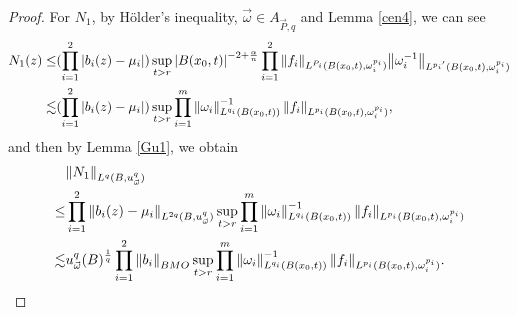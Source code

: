 \documentclass[11pt, twoside, leqno]{article}
\begin{document}
\begin{proof}[Proof]
	For ${N_1}$, by H\"older's inequality, $\vec{\omega} \in {A_{\vec P,q}}$ and Lemma \ref{cen4}, we can see 
	\begin{align}
	{N_1}(z)\notag
	\le& (\prod\limits_{i = 1}^2 {\left| {{b_i}(z) - {\mu _i}} \right|} )\mathop {\sup }\limits_{t > r} {\left| {B({x_0},t)} \right|^{ - 2 + \frac{\alpha }{n}}}\prod\limits_{i = 1}^2 {{{\left\| {{f_i}} \right\|}_{{L^{{P_i}}}(B({x_0},t),\omega _i^{{p_i}})}}{{\left\| {\omega _i^{ - 1}} \right\|}_{{L^{{p_i}^\prime }}(B({x_0},t),\omega _i^{{p_i}})}}}\notag\\
	\lesssim&(\prod\limits_{i = 1}^2 {\left| {{b_i}(z) - {\mu _i}} \right|} )\mathop {\sup }\limits_{t > r} \prod\limits_{i = 1}^m {\left\| {{\omega _i}} \right\|_{{L^{{q_i}}}(B({x_0},t))}^{ - 1}{{\left\| {{f_i}} \right\|}_{{L^{{p_i}}}(B({x_0},t),\omega _i^{{p_i}})}}},\notag
	\end{align}
	and then by Lemma \ref{Gu1}, we obtain
	\begin{align}
	&{\left\| {{N_1}} \right\|_{{L^q}(B,u_{\vec \omega }^q)}}\notag\\
	\le&\prod\limits_{i = 1}^2 {{{\left\| {{b_i}(z) - {\mu _i}} \right\|}_{{L^{2q}}(B,u_{\vec \omega }^q)}}} \mathop {\sup }\limits_{t > r} \prod\limits_{i = 1}^m {\left\| {{\omega _i}} \right\|_{{L^{{q_i}}}(B({x_0},t))}^{ - 1}{{\left\| {{f_i}} \right\|}_{{L^{{p_i}}}(B({x_0},t),\omega _i^{{p_i}})}}}\notag\\
	\lesssim&u_{\vec \omega }^q{(B)^{\frac{1}{q}}}\prod\limits_{i = 1}^2 {{{\left\| {{b_i}} \right\|}_{BMO}}} \mathop {\sup }\limits_{t > r} \prod\limits_{i = 1}^m {\left\| {{\omega _i}} \right\|_{{L^{{q_i}}}(B({x_0},t))}^{ - 1}{{\left\| {{f_i}} \right\|}_{{L^{{p_i}}}(B({x_0},t),\omega _i^{{p_i}})}}}.
	\end{align}
	

\end{proof}
\end{document}

